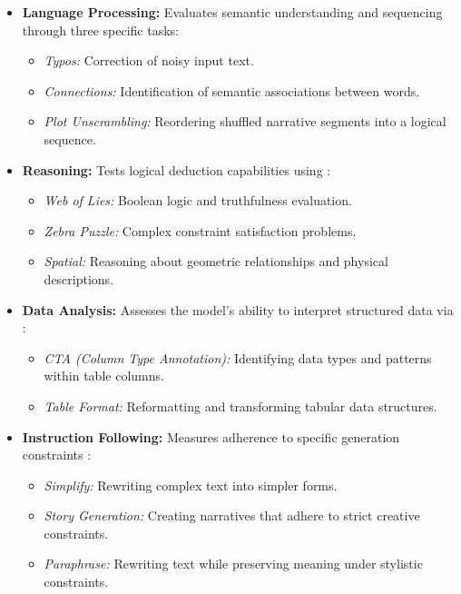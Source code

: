 \documentclass[10pt, twocolumn, a4paper]{article}
\begin{document}
\begin{itemize}
    \item \textbf{Language Processing:} Evaluates semantic understanding and sequencing through three specific tasks\cite{huggingface_language}:
    \begin{itemize}
        \item \textit{Typos:} Correction of noisy input text.
        \item \textit{Connections:} Identification of semantic associations between words.
        \item \textit{Plot Unscrambling:} Reordering shuffled narrative segments into a logical sequence.
    \end{itemize}

    \item \textbf{Reasoning:} Tests logical deduction capabilities using \cite{huggingface_reasoning}:
    \begin{itemize}
        \item \textit{Web of Lies:} Boolean logic and truthfulness evaluation.
        \item \textit{Zebra Puzzle:} Complex constraint satisfaction problems.
        \item \textit{Spatial:} Reasoning about geometric relationships and physical descriptions.
    \end{itemize}

    \item \textbf{Data Analysis:} Assesses the model's ability to interpret structured data via \cite{huggingface_data}:
    \begin{itemize}
        \item \textit{CTA (Column Type Annotation):} Identifying data types and patterns within table columns.
        \item \textit{Table Format:} Reformatting and transforming tabular data structures.
    \end{itemize}

    \item \textbf{Instruction Following:} Measures adherence to specific generation constraints \cite{huggingface_instruct}:
    \begin{itemize}
        \item \textit{Simplify:} Rewriting complex text into simpler forms.
        \item \textit{Story Generation:} Creating narratives that adhere to strict creative constraints.
        \item \textit{Paraphrase:} Rewriting text while preserving meaning under stylistic constraints.
    \end{itemize}
\end{itemize}
\end{document}
